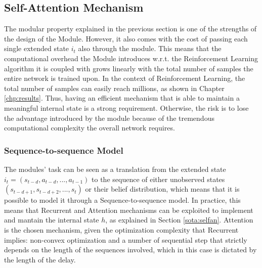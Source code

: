             
        \subsection{Self-Attention Mechanism}
            The modular property explained in the previous section is one of the strengths of the design of the Module. However, it also comes with the cost of passing each single extended state $i_t$ also through the module. This means that the computational overhead the Module introduces w.r.t. the Reinforcement Learning algorithm it is coupled with grows linearly with the total number of samples the entire network is trained upon. In the context of Reinforcement Learning, the total number of samples can easily reach millions, as shown in Chapter \ref{chp:results}. Thus, having an efficient mechanism that is able to maintain a meaningful internal state is a strong requirement. Otherwise, the risk is to lose the advantage introduced by the module because of the tremendous computational complexity the overall network requires. \newline
            
            \subsubsection{Sequence-to-sequence Model}
                The modules' task can be seen as a translation from the extended state $i_t = (s_{t-d}, a_{t-d}, ..., a_{t-1})$ to the sequence of either unobserved states $(s_{t-d+1}, s_{t-d+2}, ..., s_t)$ or their belief distribution, which means that it is possible to model it through a Sequence-to-sequence model. In practice, this means that Recurrent and Attention mechanisms can be exploited to implement and mantain the internal state $h$, as explained in Section \ref{sota:selfan}. Attention is the chosen mechanism, given the optimization complexity that Recurrent implies: non-convex optimization and a number of sequential step that strictly depends on the length of the sequences involved, which in this case is dictated by the length of the delay.
            
